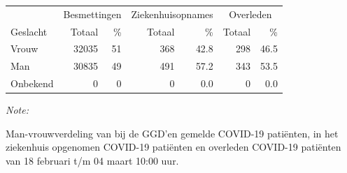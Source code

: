 \documentclass[
  english,
  man,floatsintext]{apa6}
\begin{document}
\begin{table}
\centering\begingroup\fontsize{11}{13}\selectfont

\begin{threeparttable}
\begin{tabular}{lrrrrrr}
\toprule
\multicolumn{1}{c}{ } & \multicolumn{2}{c}{Besmettingen} & \multicolumn{2}{c}{Ziekenhuisopnames} & \multicolumn{2}{c}{Overleden} \\
\cmidrule(l{3pt}r{3pt}){2-3} \cmidrule(l{3pt}r{3pt}){4-5} \cmidrule(l{3pt}r{3pt}){6-7}
Geslacht & Totaal & \% & Totaal & \% & Totaal & \%\\
\midrule
Vrouw & 32035 & 51 & 368 & 42.8 & 298 & 46.5\\
Man & 30835 & 49 & 491 & 57.2 & 343 & 53.5\\
Onbekend & 0 & 0 & 0 & 0.0 & 0 & 0.0\\
\bottomrule
\end{tabular}
\begin{tablenotes}
\item \textit{Note: } 
\item Man-vrouwverdeling van bij de GGD’en gemelde COVID-19 patiënten, in het ziekenhuis opgenomen COVID-19 patiënten en overleden COVID-19 patiënten van 18 februari t/m 04 maart 10:00 uur.
\end{tablenotes}
\end{threeparttable}
\endgroup{}
\end{table}
\newpage
\end{document}
